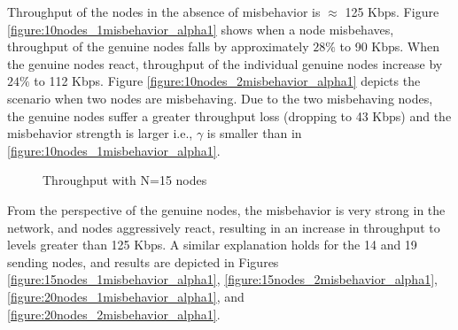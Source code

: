\documentclass[12pt,letterpaper,english]{article}
\begin{document}
Throughput of the nodes in the absence of misbehavior is $\approx$ 125 Kbps. Figure  \ref{figure:10nodes_1misbehavior_alpha1} shows when a node misbehaves, throughput of the genuine nodes falls by approximately $28\%$ to 90 Kbps. When the genuine nodes react, throughput of the individual genuine nodes increase by $24\%$ to 112 Kbps.
Figure \ref{figure:10nodes_2misbehavior_alpha1} depicts the scenario when two nodes are misbehaving. Due to the two misbehaving nodes, the genuine nodes suffer a greater throughput loss (dropping to 43 Kbps) and the misbehavior strength is larger i.e., $\gamma$ is smaller than in \ref{figure:10nodes_1misbehavior_alpha1}.
\begin{figure}[H]
\centering
{}
\caption{Throughput with N=15 nodes}
\label{figure:15nodes}
\end{figure}
From the perspective of the genuine nodes, the misbehavior is very strong in the network, and nodes aggressively react, resulting in an increase in throughput to levels greater than 125 Kbps.
A similar explanation holds for the 14 and 19 sending nodes, and results are depicted in Figures \ref{figure:15nodes_1misbehavior_alpha1}, \ref{figure:15nodes_2misbehavior_alpha1}, \ref{figure:20nodes_1misbehavior_alpha1}, and \ref{figure:20nodes_2misbehavior_alpha1}.
\end{document}
